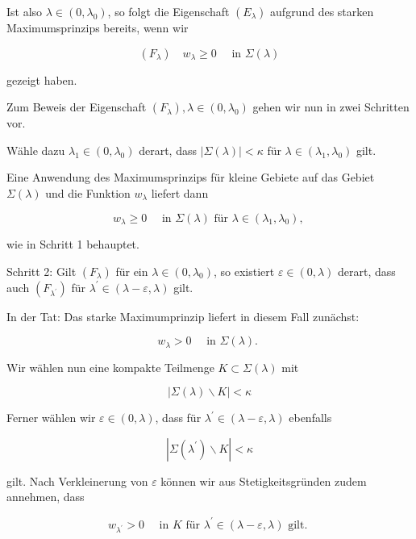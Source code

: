 \documentclass[10pt, letterpaper]{article}
\begin{document}
Ist also $\lambda \in\left(0, \lambda_{0}\right)$, so folgt die Eigenschaft $\left(E_{\lambda}\right)$ aufgrund des starken Maximumsprinzips bereits, wenn wir

$$
\left(F_{\lambda}\right) \quad w_{\lambda} \geq 0 \quad \text { in } \Sigma(\lambda)
$$

gezeigt haben.

Zum Beweis der Eigenschaft $\left(F_{\lambda}\right), \lambda \in\left(0, \lambda_{0}\right)$ gehen wir nun in zwei Schritten vor.


Wähle dazu $\lambda_{1} \in\left(0, \lambda_{0}\right)$ derart, dass $|\Sigma(\lambda)|<\kappa$ für $\lambda \in\left(\lambda_{1}, \lambda_{0}\right)$ gilt.

Eine Anwendung des Maximumsprinzips für kleine Gebiete auf das Gebiet $\Sigma(\lambda)$ und die Funktion $w_{\lambda}$ liefert dann

$$
w_{\lambda} \geq 0 \quad \text { in } \Sigma(\lambda) \text { für } \lambda \in\left(\lambda_{1}, \lambda_{0}\right) \text {, }
$$

wie in Schritt 1 behauptet.

Schritt 2: Gilt $\left(F_{\lambda}\right)$ für ein $\lambda \in\left(0, \lambda_{0}\right)$, so existiert $\varepsilon \in(0, \lambda)$ derart, dass auch $\left(F_{\lambda^{\prime}}\right)$ für $\lambda^{\prime} \in(\lambda-\varepsilon, \lambda)$ gilt.

In der Tat: Das starke Maximumprinzip liefert in diesem Fall zunächst:

$$
w_{\lambda}>0 \quad \text { in } \Sigma(\lambda) \text {. }
$$

Wir wählen nun eine kompakte Teilmenge $K \subset \Sigma(\lambda)$ mit

$$
|\Sigma(\lambda) \backslash K|<\kappa
$$

Ferner wählen wir $\varepsilon \in(0, \lambda)$, dass für $\lambda^{\prime} \in(\lambda-\varepsilon, \lambda)$ ebenfalls

$$
\left|\Sigma\left(\lambda^{\prime}\right) \backslash K\right|<\kappa
$$

gilt. Nach Verkleinerung von $\varepsilon$ können wir aus Stetigkeitsgründen zudem annehmen, dass

$$
w_{\lambda^{\prime}}>0 \quad \text { in } K \text { für } \lambda^{\prime} \in(\lambda-\varepsilon, \lambda) \text { gilt. }
$$
\end{document}

